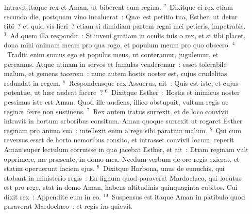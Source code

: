\lettrine[lines=10,image=true,loversize=0.05,lraise=-0.03]{I}{}ntravit itaque rex et Aman, ut biberent cum regina.
${}^{2}$~Dixitque ei rex etiam secunda die, postquam vino incaluerat~: Qu\ae\ est petitio tua, Esther, ut detur tibi~? et quid vis fieri~? etiam si dimidiam partem regni mei petieris, impetrabis.
${}^{3}$~Ad quem illa respondit~: Si inveni gratiam in oculis tuis o rex, et si tibi placet, dona mihi animam meam pro qua rogo, et populum meum pro quo obsecro.
${}^{4}$~Traditi enim sumus ego et populus meus, ut conteramur, jugulemur, et pereamus. Atque utinam in servos et famulas venderemur~: esset tolerabile malum, et gemens tacerem~: nunc autem hostis noster est, cujus crudelitas redundat in regem.
${}^{5}$~Respondensque rex Assuerus, ait~: Quis est iste, et cujus potenti\ae , ut h\ae c audeat facere~?
${}^{6}$~Dixitque Esther~: Hostis et inimicus noster pessimus iste est Aman. Quod ille audiens, illico obstupuit, vultum regis ac regin\ae\ ferre non sustinens.
${}^{7}$~Rex autem iratus surrexit, et de loco convivii intravit in hortum arboribus consitum. Aman quoque surrexit ut rogaret Esther reginam pro anima sua~: intellexit enim a rege sibi paratum malum.
${}^{8}$~Qui cum reversus esset de horto nemoribus consito, et intrasset convivii locum, reperit Aman super lectulum corruisse in quo jacebat Esther, et ait~: Etiam reginam vult opprimere, me pr\ae sente, in domo mea. Necdum verbum de ore regis exierat, et statim operuerunt faciem ejus.
${}^{9}$~Dixitque Harbona, unus de eunuchis, qui stabant in ministerio regis~: En lignum quod paraverat Mardoch\ae o, qui locutus est pro rege, stat in domo Aman, habens altitudinis quinquaginta cubitos. Cui dixit rex~: Appendite eum in eo.
${}^{10}$~Suspensus est itaque Aman in patibulo quod paraverat Mardoch\ae o~: et regis ira quievit.

